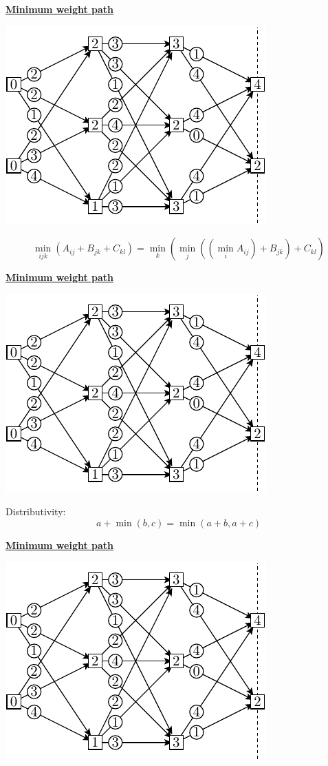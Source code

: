 \documentclass[11pt]{article}
\def\heading #1{\centerline{\underline{\bf\LARGE #1}}}
\begin{document}
\newpage %

\heading{Minimum weight path}
\centerline{\includegraphics[]{pic-minpath-4.pdf}}
$$
    \min_{ijk} ( A_{ij} + B_{jk} + C_{kl} )
    = \min_k ( \min_j ( (\min_i A_{ij} ) + B_{jk} ) + C_{kl} )
$$

\newpage %

\heading{Minimum weight path}
\centerline{\includegraphics[]{pic-minpath-4.pdf}}

Distributivity:
$$
    a + \min(b, c) = \min(a+b, a+c)
$$

\newpage %

\heading{Minimum weight path}
\centerline{\includegraphics[]{pic-minpath-4.pdf}}
\end{document}
